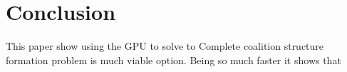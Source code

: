 \documentclass{llncs}
\begin{document}
\section{Conclusion}
This paper show using the GPU to solve to Complete coalition structure formation problem is much viable option. Being so much faster it shows that
% 
\end{document}
